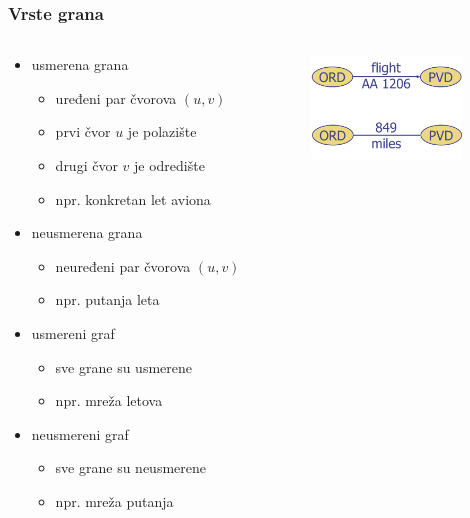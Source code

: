\documentclass[compress]{beamer}
\begin{document}
\begin{frame}[fragile]
  \frametitle{Vrste grana}
  \begin{columns}
    \begin{column}[t]{8cm}
      \begin{itemize}
        \item usmerena grana
        \begin{itemize}
          \item uređeni par čvorova $(u,v)$
          \item prvi čvor $u$ je polazište
          \item drugi čvor $v$ je odredište
          \item npr. konkretan let aviona
        \end{itemize}
        \item neusmerena grana
        \begin{itemize}
          \item neuređeni par čvorova $(u,v)$
          \item npr. putanja leta
        \end{itemize}
        \item usmereni graf
        \begin{itemize}
          \item sve grane su usmerene
          \item npr. mreža letova
        \end{itemize}
        \item neusmereni graf
        \begin{itemize}
          \item sve grane su neusmerene
          \item npr. mreža putanja
        \end{itemize}
      \end{itemize}
    \end{column}
    \begin{column}[t]{4cm}
      \begin{center}
        \includegraphics[width=4cm]{asp-14-pic02.png}
      \end{center}
    \end{column}
  \end{columns}
\end{frame}
\end{document}
